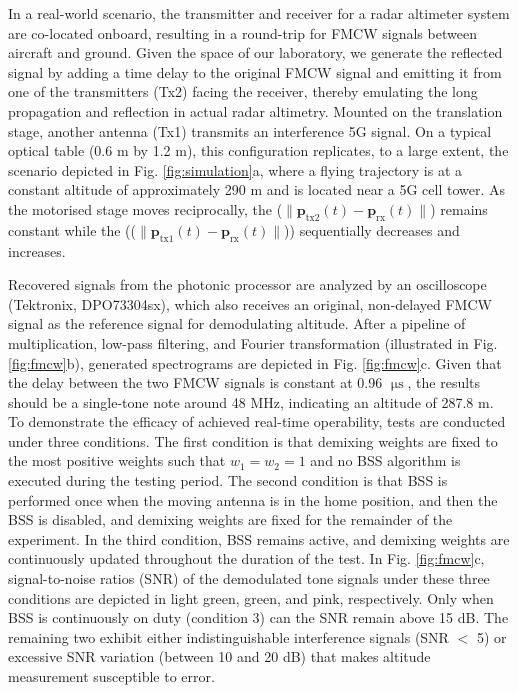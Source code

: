 \documentclass[pdflatex,mathphys]{sty}%
\begin{document}
In a real-world scenario, the transmitter and receiver for a radar altimeter system are co-located onboard, resulting in a round-trip for FMCW signals between aircraft and ground. Given the space of our laboratory, we generate the reflected signal by adding a time delay to the original FMCW signal and emitting it from one of the transmitters (Tx2) facing the receiver, thereby emulating the long propagation and reflection in actual radar altimetry. Mounted on the translation stage, another antenna (Tx1) transmits an interference 5G signal. On a typical optical table (0.6 m by 1.2 m), this configuration replicates, to a large extent, the scenario depicted in Fig. \ref{fig:simulation}a, where a flying trajectory is at a constant altitude of approximately 290 m and is located near a 5G cell tower. As the motorised stage moves reciprocally, the ($\|\textbf{p}_{\textrm{tx2}}(t)-\textbf{p}_{\textrm{rx}}(t)\|$) remains constant while the (($\|\textbf{p}_{\textrm{tx1}}(t)-\textbf{p}_{\textrm{rx}}(t)\|$)) sequentially decreases and increases.

Recovered signals from the photonic processor are analyzed by an oscilloscope (Tektronix, DPO73304sx), which also receives an original, non-delayed FMCW signal as the reference signal for demodulating altitude. After a pipeline of multiplication, low-pass filtering, and Fourier transformation (illustrated in Fig. \ref{fig:fmcw}b), generated spectrograms are depicted in Fig. \ref{fig:fmcw}c. Given that the delay between the two FMCW signals is constant at 0.96 $\upmu\textrm{s}$, the results should be a single-tone note around 48 MHz, indicating an altitude of 287.8 m. To demonstrate the efficacy of achieved real-time operability, tests are conducted under three conditions. The first condition is that demixing weights are fixed to the most positive weights such that $w_1 = w_2 = 1$ and no BSS algorithm is executed during the testing period. The second condition is that BSS is performed once when the moving antenna is in the home position, and then the BSS is disabled, and demixing weights are fixed for the remainder of the experiment. In the third condition, BSS remains active, and demixing weights are continuously updated throughout the duration of the test. In Fig. \ref{fig:fmcw}c, signal-to-noise ratios (SNR) of the demodulated tone signals under these three conditions are depicted in light green, green, and pink, respectively. Only when BSS is continuously on duty (condition 3) can the SNR remain above 15 dB. The remaining two exhibit either indistinguishable interference signals (SNR $<$ 5) or excessive SNR variation (between 10 and 20 dB) that makes altitude measurement susceptible to error.
\end{document}

